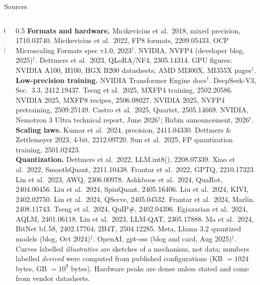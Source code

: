 \documentclass[aspectratio=169,11pt]{beamer}
\begin{document}
\begin{frame}{Sources}
\begin{columns}[T]
\begin{column}{0.5\textwidth}
\end{column}
\begin{column}{0.5\textwidth}
\fontsize{5.4}{6.4}\selectfont\color{ink}
\textbf{Formats and hardware.} Micikevicius et al.\ 2018, mixed precision, 1710.03740. Micikevicius et al.\ 2022, FP8 formats, 2209.05433. OCP Microscaling Formats spec v1.0, 2023$^\dagger$. NVIDIA, NVFP4 (developer blog, 2025)$^\dagger$. Dettmers et al.\ 2023, QLoRA/NF4, 2305.14314. GPU figures: NVIDIA A100, H100, HGX B200 datasheets; AMD MI300X, MI355X pages$^\dagger$.\\[2pt]
\textbf{Low-precision training.} NVIDIA Transformer Engine docs$^\dagger$. DeepSeek-V3, Sec.\ 3.3, 2412.19437. Tseng et al.\ 2025, MXFP4 training, 2502.20586. NVIDIA 2025, MXFP8 recipes, 2506.08027. NVIDIA 2025, NVFP4 pretraining, 2509.25149. Castro et al.\ 2025, Quartet, 2505.14669. NVIDIA, Nemotron 3 Ultra technical report, June 2026$^\dagger$; Rubin announcement, 2026$^\dagger$.\\[2pt]
\textbf{Scaling laws.} Kumar et al.\ 2024, precision, 2411.04330. Dettmers \& Zettlemoyer 2023, 4-bit, 2212.09720. Sun et al.\ 2025, FP quantization training, 2501.02423.\\[2pt]
\textbf{Quantization.} Dettmers et al.\ 2022, LLM.int8(), 2208.07339. Xiao et al.\ 2022, SmoothQuant, 2211.10438. Frantar et al.\ 2022, GPTQ, 2210.17323. Lin et al.\ 2023, AWQ, 2306.00978. Ashkboos et al.\ 2024, QuaRot, 2404.00456. Liu et al.\ 2024, SpinQuant, 2405.16406. Liu et al.\ 2024, KIVI, 2402.02750. Lin et al.\ 2024, QServe, 2405.04532. Frantar et al.\ 2024, Marlin, 2408.11743. Tseng et al.\ 2024, QuIP\#, 2402.04396. Egiazarian et al.\ 2024, AQLM, 2401.06118. Liu et al.\ 2023, LLM-QAT, 2305.17888. Ma et al.\ 2024, BitNet b1.58, 2402.17764; 2B4T, 2504.12285. Meta, Llama 3.2 quantized models (blog, Oct 2024)$^\dagger$. OpenAI, gpt-oss (blog and card, Aug 2025)$^\dagger$.\\[4pt]
\textcolor{muted}{Curves labelled \emph{illustrative} are sketches of a mechanism, not data; numbers labelled \emph{derived} were computed from published configurations (KB $=1024$ bytes, GB $=10^9$ bytes). Hardware peaks are dense unless stated and come from vendor datasheets.}
\end{column}
\end{columns}
\end{frame}
\end{document}
